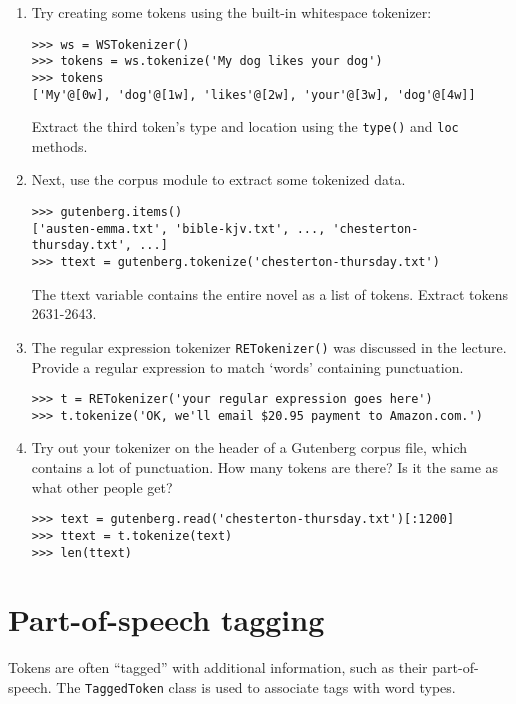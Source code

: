 \documentclass{worksheet}
\begin{document}
\begin{enumerate}
\item Try creating some tokens using the built-in whitespace tokenizer:
\begin{verbatim}
>>> ws = WSTokenizer()
>>> tokens = ws.tokenize('My dog likes your dog')
>>> tokens
['My'@[0w], 'dog'@[1w], 'likes'@[2w], 'your'@[3w], 'dog'@[4w]]
\end{verbatim}
Extract the third token's type and location using the
\texttt{type()} and \texttt{loc} methods.

\item Next, use the corpus module to extract some tokenized data.
\begin{verbatim}
>>> gutenberg.items()
['austen-emma.txt', 'bible-kjv.txt', ..., 'chesterton-thursday.txt', ...]
>>> ttext = gutenberg.tokenize('chesterton-thursday.txt')
\end{verbatim}
The ttext variable contains the entire novel as a list of tokens.
Extract tokens 2631-2643.

\item The regular expression tokenizer \texttt{RETokenizer()} was
discussed in the lecture.  Provide a regular expression to match `words'
containing punctuation.
\begin{verbatim}
>>> t = RETokenizer('your regular expression goes here')
>>> t.tokenize('OK, we'll email $20.95 payment to Amazon.com.')
\end{verbatim}

\item Try out your tokenizer on the header of a Gutenberg corpus file,
which contains a lot of punctuation.  How many tokens are there?  Is it
the same as what other people get?
\begin{verbatim}
>>> text = gutenberg.read('chesterton-thursday.txt')[:1200]
>>> ttext = t.tokenize(text)
>>> len(ttext)
\end{verbatim}

\end{enumerate}

\section*{Part-of-speech tagging}

Tokens are often ``tagged'' with additional information, such as their
part-of-speech. The \texttt{TaggedToken} class is used to associate tags with
word types. 
\end{document}
